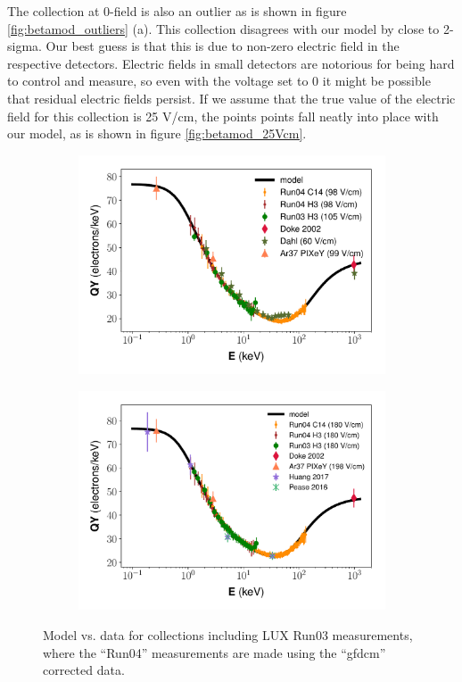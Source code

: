 The collection at 0-field is also an outlier as is shown in figure  \ref{fig:betamod_outliers} (a). This collection disagrees with our model by close to 2-sigma. Our best guess is that this is due to non-zero electric field in the respective detectors. Electric fields in small detectors are notorious for being hard to control and measure, so even with the voltage set to 0 it might be possible that residual electric fields persist. If we assume that the true value of the electric field for this collection is 25 V/cm, the points points fall neatly into place with our model, as is shown in figure \ref{fig:betamod_25Vcm}.
\begin{figure}[!h]
\centering
\begin{subfigure}{0.5\linewidth}
\includegraphics[width=\linewidth]{Figures/Yields_fit_new/NEST_fit_98Vcm_new.pdf}
\caption{}
\end{subfigure}%
\begin{subfigure}{0.5\linewidth}
\includegraphics[width=\linewidth]{Figures/Yields_fit_new/NEST_fit_180Vcm_new.pdf}
\caption{}
\end{subfigure}
\caption{Model vs. data for collections including LUX Run03 measurements, where the ``Run04'' measurements are made using the ``gfdcm'' corrected data.}
\label{fig:betamod_run03comp}
\end{figure}

